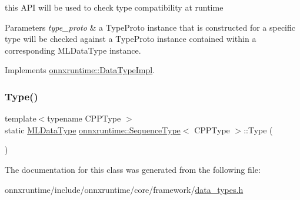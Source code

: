 this A\+PI will be used to check type compatibility at runtime 


\begin{DoxyParams}{Parameters}
{\em type\+\_\+proto} & a Type\+Proto instance that is constructed for a specific type will be checked against a Type\+Proto instance contained within a corresponding M\+L\+Data\+Type instance. \\
\hline
\end{DoxyParams}


Implements \mbox{\hyperlink{classonnxruntime_1_1DataTypeImpl_a94b2c274bd74068291356c81515d69a1}{onnxruntime\+::\+Data\+Type\+Impl}}.

\mbox{\label{classonnxruntime_1_1SequenceType_a0dcda7dce2a65f8cb0a82a6bcb891e5a}} 
\subsubsection{\texorpdfstring{Type()}{Type()}}
{\footnotesize\ttfamily template$<$typename C\+P\+P\+Type $>$ \\
static \mbox{\hyperlink{namespaceonnxruntime_ad77d0a6e838ec7da5dc35fed5ee66b49}{M\+L\+Data\+Type}} \mbox{\hyperlink{classonnxruntime_1_1SequenceType}{onnxruntime\+::\+Sequence\+Type}}$<$ C\+P\+P\+Type $>$\+::Type (\begin{DoxyParamCaption}{ }\end{DoxyParamCaption})\hspace{0.3cm}{\ttfamily [static]}}



The documentation for this class was generated from the following file\+:\begin{DoxyCompactItemize}
\item 
onnxruntime/include/onnxruntime/core/framework/\mbox{\hyperlink{data__types_8h}{data\+\_\+types.\+h}}\end{DoxyCompactItemize}
